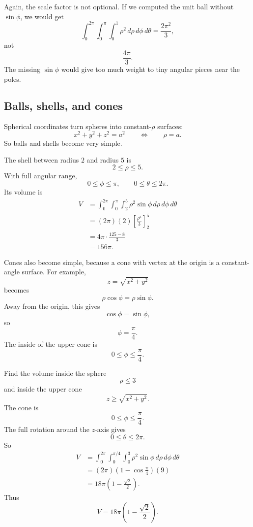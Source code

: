 Again, the scale factor is not optional.  If we computed the unit ball without
\(\sin\phi\), we would get
\[
    \int_0^{2\pi}\int_0^\pi\int_0^1 \rho^2\,d\rho\,d\phi\,d\theta
    =
    \frac{2\pi^2}{3},
\]
not
\[
    \frac{4\pi}{3}.
\]
The missing \(\sin\phi\) would give too much weight to tiny angular pieces near the
poles.

\subsection{Balls, shells, and cones}

Spherical coordinates turn spheres into constant-\(\rho\) surfaces:
\[
    x^2+y^2+z^2=a^2
    \qquad\Longleftrightarrow\qquad
    \rho=a.
\]
So balls and shells become very simple.

\begin{example}
The shell between radius \(2\) and radius \(5\) is
\[
    2\le\rho\le5.
\]
With full angular range,
\[
    0\le\phi\le\pi,\qquad 0\le\theta\le2\pi.
\]
Its volume is
\[
\begin{aligned}
V
&=
\int_0^{2\pi}\int_0^\pi\int_2^5
\rho^2\sin\phi\,d\rho\,d\phi\,d\theta\\
&=
(2\pi)(2)\left[\frac{\rho^3}{3}\right]_2^5\\
&=
4\pi\cdot\frac{125-8}{3}\\
&=
156\pi.
\end{aligned}
\]
\end{example}

Cones also become simple, because a cone with vertex at the origin is a constant-angle
surface.  For example,
\[
    z=\sqrt{x^2+y^2}
\]
becomes
\[
    \rho\cos\phi=\rho\sin\phi.
\]
Away from the origin, this gives
\[
    \cos\phi=\sin\phi,
\]
so
\[
    \phi=\frac{\pi}{4}.
\]
The inside of the upper cone is
\[
    0\le\phi\le\frac{\pi}{4}.
\]

\begin{example}
Find the volume inside the sphere
\[
    \rho\le3
\]
and inside the upper cone
\[
    z\ge \sqrt{x^2+y^2}.
\]
The cone is
\[
    0\le\phi\le\frac{\pi}{4}.
\]
The full rotation around the \(z\)-axis gives
\[
    0\le\theta\le2\pi.
\]
So
\[
\begin{aligned}
V
&=
\int_0^{2\pi}\int_0^{\pi/4}\int_0^3
\rho^2\sin\phi\,d\rho\,d\phi\,d\theta\\
&=
(2\pi)
\left(1-\cos\frac{\pi}{4}\right)
\left(9\right)\\
&=
18\pi\left(1-\frac{\sqrt2}{2}\right).
\end{aligned}
\]
Thus
\[
\boxed{
    V=18\pi\left(1-\frac{\sqrt2}{2}\right).
}
\]
\end{example}

